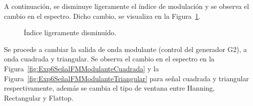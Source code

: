     A continuación, se disminuye ligeramente el índice de modulación y se 
    observa el cambio en el espectro. Dicho cambio, se visualiza en la 
    Figura~\ref{fig:Exp6SeñalFMIndiceDisminuido}.

      \begin{figure}[H]
        \centering
          \caption{Índice ligeramente disminuído.}
          \label{fig:Exp6SeñalFMIndiceDisminuido}
      \end{figure}
    
    Se procede a cambiar la salida de onda modulante (control del generador G2), a onda 
    cuadrada y triangular. Se observa el cambio en el espectro en la 
    Figura~\ref{fig:Exp6SeñalFMModulanteCuadrada} y la 
    Figura~\ref{fig:Exp6SeñalFMModulanteTriangular} para señal 
    cuadrada y triangular respectivamente, además se cambia el tipo 
    de ventana entre Hanning, Rectangular y Flattop.

